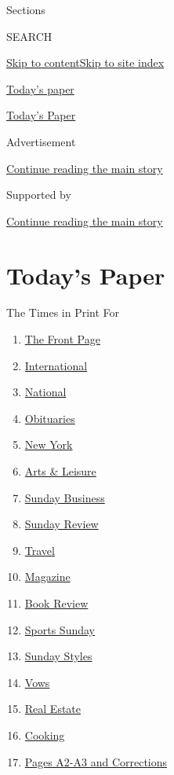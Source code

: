 Sections

SEARCH

\protect\hyperlink{site-content}{Skip to
content}\protect\hyperlink{site-index}{Skip to site index}

\href{https://www.nytimes3xbfgragh.onion/section/todayspaper}{Today's
paper}

\href{https://myaccount.nytimes3xbfgragh.onion/auth/login?response_type=cookie\&client_id=vi}{}

\href{https://www.nytimes3xbfgragh.onion/section/todayspaper}{Today's
Paper}

Advertisement

\protect\hyperlink{after-top}{Continue reading the main story}

Supported by

\protect\hyperlink{after-sponsor}{Continue reading the main story}

\hypertarget{todays-paper}{%
\section{Today's Paper}\label{todays-paper}}

The Times in Print For

\begin{enumerate}
\def\labelenumi{\arabic{enumi}.}
\tightlist
\item
  \protect\hyperlink{thefrontpage}{The Front Page}
\item
  \protect\hyperlink{international}{International}
\item
  \protect\hyperlink{national}{National}
\item
  \protect\hyperlink{obituaries}{Obituaries}
\item
  \protect\hyperlink{newyork}{New York}
\item
  \protect\hyperlink{artsux5cux26leisure}{Arts \& Leisure}
\item
  \protect\hyperlink{sundaybusiness}{Sunday Business}
\item
  \protect\hyperlink{sundayreview}{Sunday Review}
\item
  \protect\hyperlink{travel}{Travel}
\item
  \protect\hyperlink{magazine}{Magazine}
\item
  \protect\hyperlink{bookreview}{Book Review}
\item
  \protect\hyperlink{sportssunday}{Sports Sunday}
\item
  \protect\hyperlink{sundaystyles}{Sunday Styles}
\item
  \protect\hyperlink{vows}{Vows}
\item
  \protect\hyperlink{realestate}{Real Estate}
\item
  \protect\hyperlink{cooking}{Cooking}
\item
  \protect\hyperlink{pagesa2-a3andcorrections}{Pages A2-A3 and
  Corrections}
\end{enumerate}

